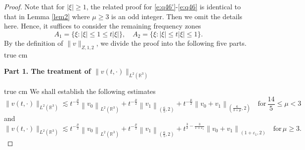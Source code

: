 \documentclass[11pt,twoside]{article}
\newcommand{\R}{\mathbb R}
\newcommand{\f}{\frac}
\theoremstyle{plain}
\theoremstyle{definition}
\theoremstyle{remark}
\numberwithin{equation}{section}
\begin{document}
\begin{proof}
Note that for $|\xi|\geq 1$, the related proof for \eqref{e:q46'}-\eqref{e:q46} is identical to that in Lemma \ref{lem2}
where $\mu\ge3$ is an odd integer. Then we omit the details here. Hence, it suffices to consider the remaining frequency zones
\begin{equation}\label{e:q47}
A_1=\{\xi: |\xi| \leq 1 \leq t|\xi|\}, \quad A_2=\{\xi: |\xi|\leq t|\xi| \leq 1\}.
\end{equation}
By the definition of $\|v\|_{Z, 1, 2}$,
we divide the proof into the following five parts.
 true cm

{\bf Part 1.  The treatment  of $\|v(t, \cdot)\|_{L^2(\R^3)}$ }

 true cm
We shall establish the following estimates
\begin{equation}\label{e:q48'}
\|v(t, \cdot)\|_{L^2(\R^3)} \lesssim t^{-\f{\mu}{2}}\left\|v_0\right\|_{L^2(\R^3)}
+t^{-\f{\mu}{2}}\left\|v_1\right\|_{(\f{6}{5}, 2)}
+t^{-\f{\mu}{2}}\left\|v_0+v_1\right\|_{(\f{6}{3+\mu}, 2)}\quad \text{for}\, \f{14}{5}\leq\mu<3
\end{equation}
and
\begin{equation}\label{e:q48}
\|v(t, \cdot)\|_{L^2(\R^3)} \lesssim t^{-\f{\mu}{2}}\left\|v_0\right\|_{L^2(\R^3)}
+t^{-\f{\mu}{2}}\left\|v_1\right\|_{(\f{6}{5}, 2)}
+t^{\f{3}{2}-\f{3}{1+\varepsilon_1}}\left\|v_0+v_1\right\|_{(1+\varepsilon_1, 2)} \quad \text{for}\, \mu\geq3.
\end{equation}



\end{proof}
\end{document}
